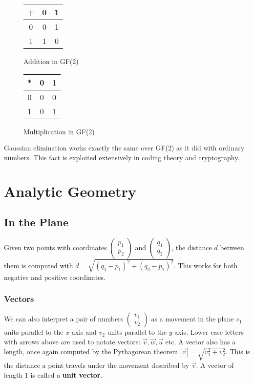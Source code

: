 \documentclass{article}
\begin{document}
	\begin{figure}[ht]
		\begin{minipage}[t]{0.45\textwidth}
		\centering
			\begin{tabular}{c|cc}
				+ & 0 & 1 \\ \hline
				0 & 0 & 1 \\
				1 & 1 & 0
			\end{tabular}
			
			\caption{Addition in GF(2)}
		\end{minipage}
		\hfill
		\begin{minipage}[t]{0.45\textwidth}
		\centering
			\begin{tabular}{c|cc}
			* & 0 & 1 \\ \hline
			0 & 0 & 0 \\
			1 & 0 & 1
			\end{tabular}
			\caption{Multiplication in GF(2)}
		\end{minipage}
	\end{figure}
	
	Gaussian elimination works exactly the same over GF(2) as it did with ordinary numbers. This fact is exploited extensively in coding theory and cryptography.
	
	\section{Analytic Geometry}
	\subsection{In the Plane}
	Given two points with coordinates $\left(\begin{array}{c} p_{1} \\ p_{2}\end{array}\right)$ and $\left(\begin{array}{c} q_{1} \\ q_{2}\end{array}\right)$, the distance $d$ between them is computed with $d = \sqrt{(q_{1} - p_{1})^{2} + (q_{2} - p_{2})^{2} }$. This works for both negative and positive coordinates.
	
	\subsubsection{Vectors}
	We can also interpret a pair of numbers $\left(\begin{array}{c} v_{1} \\ v_{2}\end{array}\right)$ as a movement in the plane $v_{1}$ units parallel to the $x$-axis and $v_{2}$ units parallel to the $y$-axis. Lower case letters with arrows above are used to notate vectors: $\overrightarrow{v}, \overrightarrow{w}, \overrightarrow{u}$ etc. A vector also has a length, once again computed by the Pythagorean theorem $ |\overrightarrow{v}| = \sqrt{v_{1}^{2} + v_{2}^{2}} $. This is the distance a point travels under the movement described by $\overrightarrow{v}$. A vector of length 1 is called a \textbf{unit vector}.
	
\end{document}
